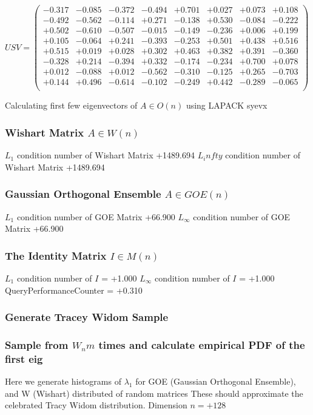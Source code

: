 \documentclass[9pt]{article}
\theoremstyle{plain}
\theoremstyle{definition}
\theoremstyle{remark}
\numberwithin{equation}{section}
\begin{document}
$U S V = \left(
\begin{array}{
cccccccc}
-0.317 & -0.085 & -0.372 & -0.494 & +0.701 & +0.027 & +0.073 & +0.108 \\
-0.492 & -0.562 & -0.114 & +0.271 & -0.138 & +0.530 & -0.084 & -0.222 \\
+0.502 & -0.610 & -0.507 & -0.015 & -0.149 & -0.236 & +0.006 & +0.199 \\
+0.105 & -0.064 & +0.241 & -0.393 & -0.253 & +0.501 & +0.438 & +0.516 \\
+0.515 & +0.019 & +0.028 & +0.302 & +0.463 & +0.382 & +0.391 & -0.360 \\
-0.328 & +0.214 & -0.394 & +0.332 & -0.174 & -0.234 & +0.700 & +0.078 \\
+0.012 & -0.088 & +0.012 & -0.562 & -0.310 & -0.125 & +0.265 & -0.703 \\
+0.144 & +0.496 & -0.614 & -0.102 & -0.249 & +0.442 & -0.289 & -0.065 \\
\end{array}
\right)$ \newline 

Calculating first few eigenvectors of $A \in O(n)$ using LAPACK syevx

\subsubsection{Wishart Matrix $A \in W(n)$}
$L_1$ condition number of Wishart Matrix +1489.694
$L_infty$ condition number of Wishart Matrix +1489.694
\subsubsection{Gaussian Orthogonal Ensemble $A \in GOE(n)$}
$L_1$ condition number of GOE Matrix +66.900
$L_\infty$ condition number of GOE Matrix +66.900
\subsubsection{The Identity Matrix $I \in M(n)$}
$L_1$ condition number of $I$ = +1.000
$L_\infty$ condition number of $I$ = +1.000
QueryPerformanceCounter  =  +0.310
\subsubsection{Generate Tracey Widom Sample}
\subsubsection{Sample from $W_n m$ times and calculate empirical PDF of the first eig}
Here we generate histograms of $\lambda_1$ for GOE (Gaussian Orthogonal Ensemble), and W (Wishart) 		 distributed of random matrices
These should approximate the celebrated Tracy Widom distribution.
Dimension $n = +128$
\end{document}
